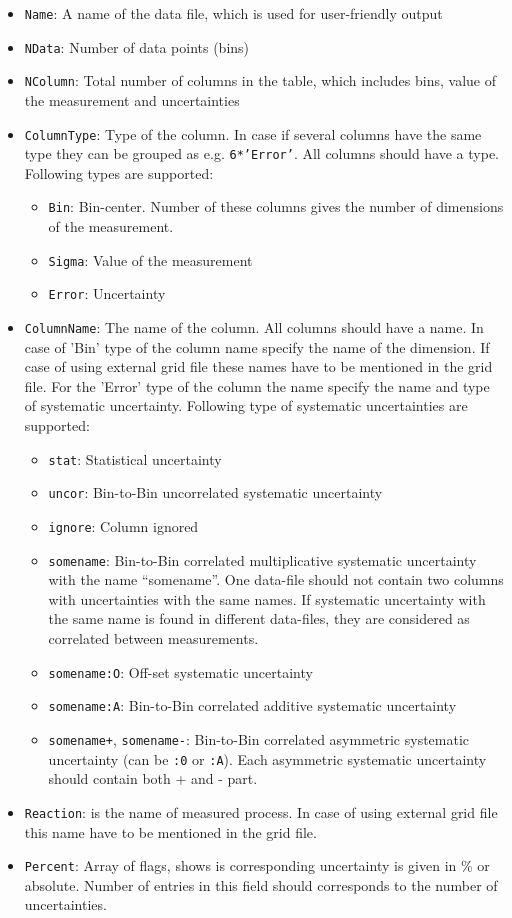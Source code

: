 \begin{itemize}
\item {\tt Name}: A name of the data file, which is used for user-friendly output
\item {\tt NData}: Number of data points (bins)
\item {\tt NColumn}: Total number of columns in the table, which includes bins, value of the measurement and uncertainties
\item {\tt ColumnType}: Type of the column. In case if several columns have the same type they can be grouped as e.g. {\tt 6*'Error'}. All columns should have a type. Following types are supported:
\begin{itemize}
\item {\tt Bin}: Bin-center. Number of these columns gives the number of dimensions of the measurement.
\item {\tt Sigma}: Value of the measurement  
\item {\tt Error}: Uncertainty
\end{itemize}
\item {\tt ColumnName}: The name of the column. All columns should have a name. In case of 'Bin' type of the column name specify the name of the dimension. If case of using external grid file these names have to be mentioned in the grid file. For the 'Error' type of the column the name specify the name and type of systematic uncertainty. Following type of systematic uncertainties are supported:
\begin{itemize}
\item {\tt stat}: Statistical uncertainty
\item {\tt uncor}:  Bin-to-Bin uncorrelated systematic uncertainty
\item {\tt ignore}: Column ignored
\item {\tt somename}: Bin-to-Bin correlated multiplicative systematic uncertainty with the name ``somename''. One data-file should not contain two columns with uncertainties with the same names. If systematic uncertainty with the same name is found in different data-files, they are considered as correlated between measurements.
\item {\tt somename:O}: Off-set systematic uncertainty
\item {\tt somename:A}: Bin-to-Bin correlated additive systematic uncertainty
\item {\tt somename+}, {\tt somename-}: Bin-to-Bin correlated asymmetric systematic uncertainty (can be {\tt :0} or {\tt :A}). Each asymmetric systematic uncertainty should contain both + and - part. 
\end{itemize}
\item {\tt Reaction}: is the name of measured process. In case of using external grid file this name have to be mentioned in the grid file.
\item {\tt Percent}: Array of flags, shows is corresponding uncertainty is given in \% or absolute. Number of entries in this field should corresponds to the number of uncertainties. 

\end{itemize}

